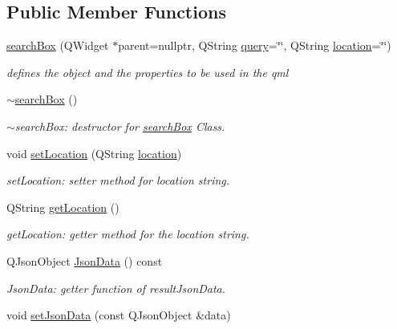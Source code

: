 \subsection*{Public Member Functions}
\begin{DoxyCompactItemize}
\item 
\hyperlink{classstd_1_1searchBox_a8c14effb55526c2e064ada85d733bbb7}{search\+Box} (Q\+Widget $\ast$parent=nullptr, Q\+String \hyperlink{classstd_1_1searchBox_aea961f663dcd293eaa5ba38828f730e4}{query}=\char`\"{}\char`\"{}, Q\+String \hyperlink{classstd_1_1searchBox_a02d951e4331a6b3a598b59d997a6564e}{location}=\char`\"{}\char`\"{})
\begin{DoxyCompactList}\small\item\em defines the object and the properties to be used in the qml \end{DoxyCompactList}\item 
\hyperlink{classstd_1_1searchBox_a8667c19faa2dd541f9cb47f83cfb4699}{$\sim$search\+Box} ()
\begin{DoxyCompactList}\small\item\em $\sim$search\+Box\+: destructor for \hyperlink{classstd_1_1searchBox}{search\+Box} Class. \end{DoxyCompactList}\item 
void \hyperlink{classstd_1_1searchBox_a8c40ff5ea326b88f6efeb31538b1c858}{set\+Location} (Q\+String \hyperlink{classstd_1_1searchBox_a02d951e4331a6b3a598b59d997a6564e}{location})
\begin{DoxyCompactList}\small\item\em set\+Location\+: setter method for location string. \end{DoxyCompactList}\item 
Q\+String \hyperlink{classstd_1_1searchBox_ac6065bf9e28a07ea2e69abd69ec01279}{get\+Location} ()
\begin{DoxyCompactList}\small\item\em get\+Location\+: getter method for the location string. \end{DoxyCompactList}\item 
Q\+Json\+Object \hyperlink{classstd_1_1searchBox_a53faa5ee17f5190b1b81ac36b44e9ad2}{Json\+Data} () const
\begin{DoxyCompactList}\small\item\em Json\+Data\+: getter function of result\+Json\+Data. \end{DoxyCompactList}\item 
void \hyperlink{classstd_1_1searchBox_ae5f4b975f9d7958d1748de12777a9aca}{set\+Json\+Data} (const Q\+Json\+Object \&data)

\end{DoxyCompactItemize}
